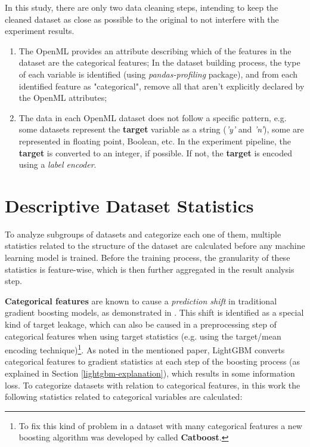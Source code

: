 In this study, there are only two data cleaning steps, intending to keep the cleaned dataset as close as possible to the original to not interfere with the experiment results.
\begin{enumerate}
    \item The OpenML provides an attribute describing which of the features in the dataset are the categorical features; In the dataset building process, the type of each variable is identified (using \textit{pandas-profiling} package), and from each identified feature as "categorical", remove all that aren't explicitly declared by the OpenML attributes;
    \item The data in each OpenML dataset does not follow a specific pattern, e.g. some datasets represent the \textbf{target} variable as a string (\textit{'y'} and \textit{'n'}), some are represented in floating point, Boolean, etc. In the experiment pipeline, the \textbf{target} is converted to an integer, if possible. If not, the \textbf{target} is encoded using a \textit{label encoder}.
\end{enumerate}

\section{Descriptive Dataset Statistics}
\label{dataset-aggregated-statistics}

To analyze subgroups of datasets and categorize each one of them, multiple statistics related to the structure of the dataset are calculated before any machine learning model is trained. Before the training process, the granularity of these statistics is feature-wise, which is then further aggregated in the result analysis step.

\textbf{Categorical features} are known to cause a \textit{prediction shift} in traditional gradient boosting models, as demonstrated in \cite{prokhorenkova2018catboost}. This shift is identified as a special kind of target leakage, which can also be caused in a preprocessing step of categorical features when using target statistics (e.g. using the target/mean encoding technique)\footnote{To fix this kind of problem in a dataset with many categorical features a new boosting algorithm was developed by \cite{dorogush2018catboost} called \textbf{Catboost}.}. As noted in the mentioned paper, LightGBM converts categorical features to gradient statistics at each step of the boosting process (as explained in Section \ref{lightgbm-explanation}), which results in some information loss. To categorize datasets with relation to categorical features, in this work the following statistics related to categorical variables are calculated:

